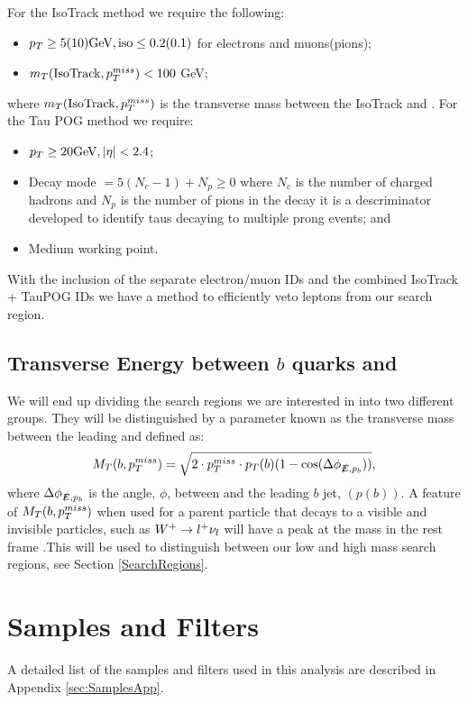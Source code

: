 For the IsoTrack method we require the following:
\begin{itemize}
	\item $p_{T}\geq5(10) \text{GeV}, \text{iso}\leq0.2(0.1)$ for electrons and muons(pions);
	\item $m_T(\text{IsoTrack},p_{T}^{miss})<100$ GeV;
\end{itemize}
where $m_T(\text{IsoTrack},p_{T}^{miss})$ is the transverse mass between the IsoTrack and \met. For the Tau POG method we require:
\begin{itemize}
	\item $p_{T}\geq20 \text{GeV}, |\eta|<2.4$;
	\item Decay mode $=5(N_c-1)+N_p\geq0$ where $N_c$ is the number of charged hadrons and $N_p$ is the number of pions in the decay it is a descriminator developed to identify taus decaying to multiple prong events; and
	\item Medium working point.
\end{itemize}
With the inclusion of the separate electron/muon IDs and the combined IsoTrack + TauPOG IDs we have a method to efficiently veto leptons from our search region.

\subsection{Transverse Energy between $b$ quarks and \met} \label{sec:transverseMass}
We will end up dividing the search regions we are interested in into two different groups. They will be distinguished by a parameter known as the transverse mass between the leading \bjet{} and \met{} defined as:
\begin{equation}\label{TransverseMass}
M_T(b,p_{T}^{miss})=\sqrt{2\cdot p_{T}^{miss}\cdot p_{T}(b)(1-\cos(\Delta\phi_{\slashed{E},p_b}))},
\end{equation}
where $\Delta\phi_{\slashed{E},p_b}$ is the angle, $\phi$, between \met and the leading $b$ jet, $(p(b))$. A feature of $M_T(b,p_{T}^{miss})$ when used for a parent particle that decays to a visible and invisible particles, such as $W^+\rightarrow l^+\nu_l$ will have a peak at the \W{} mass in the rest frame \cite{tovey_transformation_2019}.This will be used to distinguish between our low and high mass search regions, see Section \ref{SearchRegions}.

\section{Samples and Filters}\label{Samples}
A detailed list of the samples and filters used in this analysis are described in Appendix \ref{sec:SamplesApp}.

